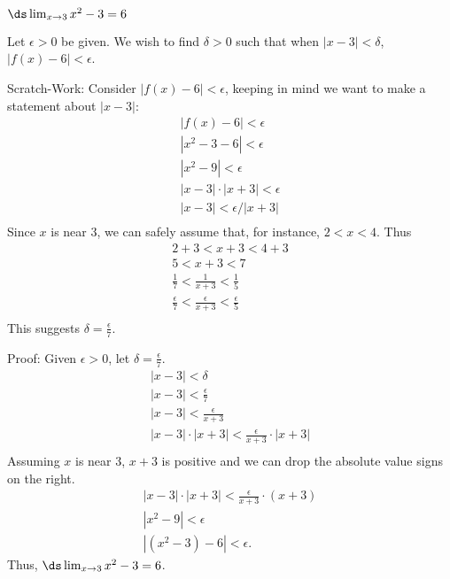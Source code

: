 {$\ds\lim_{x\to 3} x^2-3 = 6$}
{Let $\epsilon >0$ be given. We wish to find $\delta >0$ such that when $|x-3|<\delta$, $|f(x)-6|<\epsilon$. 

Scratch-Work:
Consider $|f(x)-6|<\epsilon$, keeping in  mind we want to make a statement about $|x-3|$:
\begin{gather*}
|f(x) -6 | < \epsilon \\
|x^2-3 -6 |<\epsilon \\
| x^2-9 | < \epsilon \\
| x-3 |\cdot|x+3| < \epsilon \\
| x-3 | < \epsilon/|x+3| \\
\end{gather*}
Since $x$ is near 3, we can safely assume that, for instance, $2<x<4$. Thus
\begin{gather*}
2+3<x+3<4+3 \\
5 < x+3 < 7 \\
\frac{1}{7} < \frac{1}{x+3} < \frac{1}{5} \\
\frac{\epsilon}{7} < \frac{\epsilon}{x+3} < \frac{\epsilon}{5} \\
\end{gather*}
This suggests $\delta =\frac{\epsilon}{7}$.

Proof: Given $\epsilon>0$, let $\delta =\frac{\epsilon}{7}$.
\begin{gather*}
|x-3|<\delta \\
|x-3| < \frac{\epsilon}7\\
|x-3| < \frac{\epsilon}{x+3}\\
|x-3|\cdot|x+3| < \frac{\epsilon}{x+3}\cdot|x+3|\\
\end{gather*}
Assuming $x$ is near 3, $x+3$ is positive and we can drop the absolute value signs on the right.
\begin{gather*}
|x-3|\cdot|x+3| < \frac{\epsilon}{x+3}\cdot(x+3)\\
|x^2-9| < \epsilon\\
|(x^2-3) - 6| < \epsilon.
\end{gather*}
Thus, $\ds\lim_{x\to 3} x^2-3 = 6$.
}


